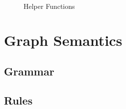 \documentclass{article}
\begin{document}
\begin{figure}

        \caption{Helper Functions}
        \label{fig_langhelper}
    \end{figure}


    \section{Graph Semantics}
      \subsection{Grammar}
      \begin{grammar}
        \grule[graph]{\ggraph}{ \{\gedge, \ldots\} }
        \grule[edges]{\gedge}{
                    \gnode \gsBefore \gnode
            \gor    \gnode \gsSkip \gnode
        }
        \grule[nodes]{\gnode}{
                    \gsstart
            \gor    \gsend
            \gor    \gsLR{\olbl, \omstack, \gtime}
            \gor    \gsLR{\genter, \olbl, \gtime}
            \gor    \gsLR{\gleave, \olbl, \gtime}
        }

      \end{grammar}
      \subsection{Rules}
\end{document}
